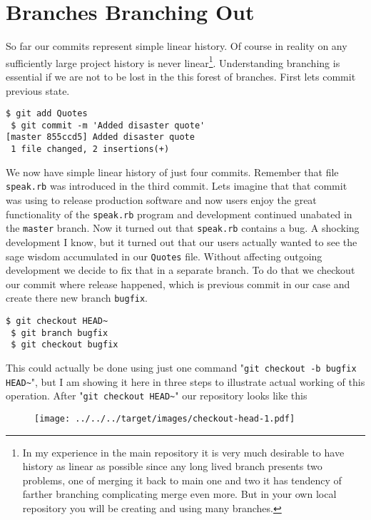 \documentclass{article}
\theoremstyle{definition}
\begin{document}
        \section{Branches Branching Out}
        So far our commits represent simple linear history. Of course in reality on any sufficiently large project
        history is never linear\footnote{In my experience in the main repository it is very much desirable to have
        history as linear as possible since any long lived branch presents two problems, one of merging it back to
        main one and two it has tendency of farther branching complicating merge even more. But in your own local
        repository you will be creating and using many branches.}. Understanding branching is essential if we are
        not to be lost in the this forest of branches. First lets commit previous state.
        \begin{Verbatim}[frame=single]
 $ git add Quotes
 $ git commit -m 'Added disaster quote'
[master 855ccd5] Added disaster quote
 1 file changed, 2 insertions(+)
        \end{Verbatim}
        We now have simple linear history of just four commits. Remember that file \texttt{speak.rb} was introduced in
        the third commit. Lets imagine that that commit was using to release production software and now users enjoy the
        great functionality of the \texttt{speak.rb} program and development continued unabated in the \texttt{master}
        branch. Now it turned out that \texttt{speak.rb} contains a bug. A shocking development I know, but it turned
        out that our users actually wanted to see the sage wisdom accumulated in our \texttt{Quotes} file. Without
        affecting outgoing development we decide to fix that in a separate branch. To do that we checkout our commit
        where release happened, which is previous commit in our case and create there new branch \texttt{bugfix}.
        \begin{Verbatim}[frame=single]
 $ git checkout HEAD~
 $ git branch bugfix
 $ git checkout bugfix
        \end{Verbatim}
        This could actually be done using just one command "\texttt{git checkout -b bugfix HEAD\textasciitilde}", but I
        am showing it here in three steps to illustrate actual working of this operation.
        After "\texttt{git checkout HEAD\textasciitilde}" our repository looks like this

        \begin{figure}[h]
        \centering\texttt{[image: ../../../target/images/checkout-head-1.pdf]}
        \caption{\label{fig:checkout-head-1}}
        \end{figure}
\end{document}

